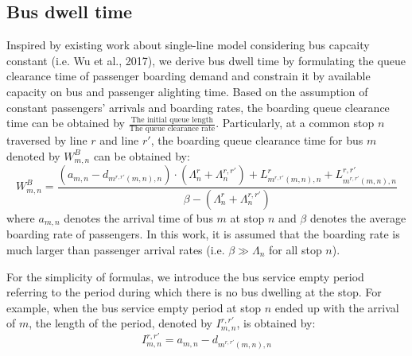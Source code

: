 \documentclass[smallextended]{svjour3}       %
\begin{document}
\begin{Abstract}
\subsection{Bus dwell time}
Inspired by existing work about single-line model considering bus capcaity constant (i.e. Wu et al., 2017), 
we derive bus dwell time by formulating the queue clearance time of passenger boarding demand 
and constrain it by available capacity on bus and passenger alighting time.
Based on the assumption of constant passengers' arrivals and boarding rates, 
the boarding queue clearance time can be obtained by 
$\frac{\text{The initial queue length}}{\text{The queue clearance rate}}$. 
Particularly, at a common stop $n$ traversed by line $r$ and line $r'$, 
the boarding queue clearance time for bus $m$ denoted by $W_{m,n}^{B}$ can be obtained by:
\begin{equation}
    W_{m,n}^{B} = \frac{\left(a_{m,n}-d_{m^{r,r'}(m,n),n}\right)\cdot \left(\Lambda_{n}^{r}+\Lambda_{n}^{r,r'}\right)
    +L_{m^{r,r'}(m,n),n}^{r}+L_{m^{r,r'}(m,n),n}^{r,r'}}
    {\beta-\left(\Lambda_{n}^{r}+\Lambda_{n}^{r,r'}\right)}
\end{equation}
where $a_{m,n}$ denotes the arrival time of bus $m$ at stop $n$ 
and $\beta$ denotes the average boarding rate of passengers. 
In this work, it is assumed that the boarding rate is much larger than 
passenger arrival rates (i.e. $\beta \gg \Lambda_{n}$ for all stop $n$). 

For the simplicity of formulas, 
we introduce the bus service empty period referring to the period during which there is no bus dwelling at the stop. 
For example, when the bus service empty period at stop $n$ ended up with the arrival of $m$, 
the length of the period, denoted by $I_{m,n}^{r,r'}$, is obtained by:
\begin{equation}
    I_{m,n}^{r,r'} = a_{m,n} - d_{m^{r,r'}(m,n),n}
\end{equation}


\end{Abstract}
\end{document}

